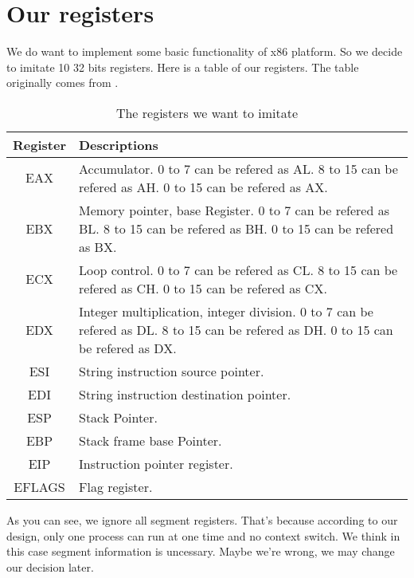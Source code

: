 \documentclass[12pt]{extarticle}
\begin{document}
\section{Our registers}
We do want to implement some basic functionality of x86 platform. So we decide to imitate 10  32 bits registers. Here is a table of our registers.
The table originally comes from \cite{kusswurm2014modern}.
\begin{table}[h!]
    \centering
    \begin{tabular}{||c | p{9cm}||} 
     \hline
     Register & Descriptions \\ [0.5ex] 
     \hline
     EAX & Accumulator. 0 to 7 can be refered as AL. 8 to 15 can be refered as AH. 0 to 15 can be refered as AX. \\ 
     \hline
     EBX & Memory pointer, base Register. 0 to 7 can be refered as BL. 8 to 15 can be refered as BH. 0 to 15 can be refered as BX. \\
     \hline
     ECX & Loop control. 0 to 7 can be refered as CL. 8 to 15 can be refered as CH. 0 to 15 can be refered as CX. \\
     \hline
     EDX & Integer multiplication, integer division. 0 to 7 can be refered as DL. 8 to 15 can be refered as DH. 0 to 15 can be refered as DX. \\
     \hline
     ESI & String instruction source pointer. \\
     \hline
     EDI & String instruction destination pointer. \\
     \hline
     ESP & Stack Pointer. \\
     \hline
     EBP & Stack frame base Pointer. \\
     \hline
     EIP & Instruction pointer register. \\
     \hline
     EFLAGS & Flag register. \\
     \hline
    \end{tabular}
    \caption{The registers we want to imitate}
    \label{table:1}
\end{table}
As you can see, we ignore all segment registers. That's because according to our design, only one process can run at one time and no context switch.
We think in this case segment information is uncessary. Maybe we're wrong, we may change our decision later.  
\end{document}

